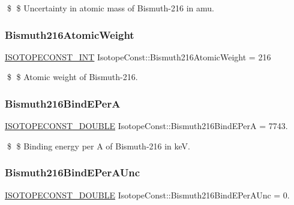 \$ \$ Uncertainty in atomic mass of Bismuth-\/216 in amu. \mbox{\label{group___isotope_const-_bismuth-_bi216_ga4b7df9137e68b1bc1487dc4d0d1e9548}} 
\subsubsection{\texorpdfstring{Bismuth216\+Atomic\+Weight}{Bismuth216AtomicWeight}}
{\footnotesize\ttfamily \mbox{\hyperlink{group___isotope_const-_macros_ga5f18360b3e99483a35c32d789e62621c}{I\+S\+O\+T\+O\+P\+E\+C\+O\+N\+S\+T\+\_\+\+I\+NT}} Isotope\+Const\+::\+Bismuth216\+Atomic\+Weight = 216}

\$ \$ Atomic weight of Bismuth-\/216. \mbox{\label{group___isotope_const-_bismuth-_bi216_ga4cf59923f5e068821f193a182ab2cc43}} 
\subsubsection{\texorpdfstring{Bismuth216\+Bind\+E\+PerA}{Bismuth216BindEPerA}}
{\footnotesize\ttfamily \mbox{\hyperlink{group___isotope_const-_macros_ga8f45a7272ce02c0b4c65c44636ed719a}{I\+S\+O\+T\+O\+P\+E\+C\+O\+N\+S\+T\+\_\+\+D\+O\+U\+B\+LE}} Isotope\+Const\+::\+Bismuth216\+Bind\+E\+PerA = 7743.}

\$ \$ Binding energy per A of Bismuth-\/216 in keV. \mbox{\label{group___isotope_const-_bismuth-_bi216_ga7070136de6e6a7a364207ca34bd76fb7}} 
\subsubsection{\texorpdfstring{Bismuth216\+Bind\+E\+Per\+A\+Unc}{Bismuth216BindEPerAUnc}}
{\footnotesize\ttfamily \mbox{\hyperlink{group___isotope_const-_macros_ga8f45a7272ce02c0b4c65c44636ed719a}{I\+S\+O\+T\+O\+P\+E\+C\+O\+N\+S\+T\+\_\+\+D\+O\+U\+B\+LE}} Isotope\+Const\+::\+Bismuth216\+Bind\+E\+Per\+A\+Unc = 0.}


